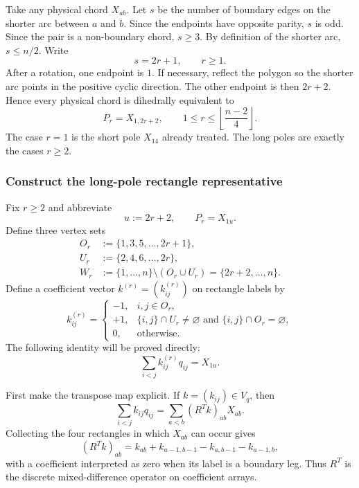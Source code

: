 \documentclass[11pt]{article}
\theoremstyle{definition}
\begin{document}
Take any physical chord $X_{ab}$.  Let $s$ be the number of boundary edges on the shorter arc between $a$ and $b$.  Since the endpoints have opposite parity, $s$ is odd.  Since the pair is a non-boundary chord, $s\ge3$.  By definition of the shorter arc, $s\le n/2$.  Write
\[
s=2r+1,
\qquad
r\ge1.
\]
After a rotation, one endpoint is $1$.  If necessary, reflect the polygon so the shorter arc points in the positive cyclic direction.  The other endpoint is then $2r+2$.  Hence every physical chord is dihedrally equivalent to
\begin{equation}
P_r=X_{1,2r+2},
\qquad
1\le r\le\left\lfloor\frac{n-2}{4}\right\rfloor.
\label{eq:Pr}
\end{equation}
The case $r=1$ is the short pole $X_{14}$ already treated.  The long poles are exactly the cases $r\ge2$.

\subsubsection{Construct the long-pole rectangle representative}

Fix $r\ge2$ and abbreviate
\[
u:=2r+2,
\qquad
P_r=X_{1u}.
\]
Define three vertex sets
\begin{align}
O_r&:=\{1,3,5,\ldots,2r+1\},\label{eq:Or}\\
U_r&:=\{2,4,6,\ldots,2r\},\label{eq:Ur}\\
W_r&:=\{1,\ldots,n\}\setminus(O_r\cup U_r)
=\{2r+2,\ldots,n\}.
\label{eq:Wr}
\end{align}
Define a coefficient vector $k^{(r)}=(k^{(r)}_{ij})$ on rectangle labels by
\begin{equation}
k^{(r)}_{ij}
=
\begin{cases}
-1,&i,j\in O_r,\\
+1,&\{i,j\}\cap U_r\neq\varnothing
\text{ and }\{i,j\}\cap O_r=\varnothing,\\
0,&\text{otherwise}.
\end{cases}
\label{eq:kr}
\end{equation}
The following identity will be proved directly:
\begin{equation}
\sum_{i<j}k^{(r)}_{ij}q_{ij}=X_{1u}.
\label{eq:kr-rep}
\end{equation}

First make the transpose map explicit.  If $k=(k_{ij})\in V_q$, then
\[
\sum_{i<j}k_{ij}q_{ij}
=\sum_{a<b}(R^Tk)_{ab}X_{ab}.
\]
Collecting the four rectangles in which $X_{ab}$ can occur gives
\begin{equation}
(R^Tk)_{ab}
=k_{ab}+k_{a-1,b-1}-k_{a,b-1}-k_{a-1,b},
\label{eq:RT-mixed}
\end{equation}
with a coefficient interpreted as zero when its label is a boundary leg.  Thus $R^T$ is the discrete mixed-difference operator on coefficient arrays.
\end{document}
